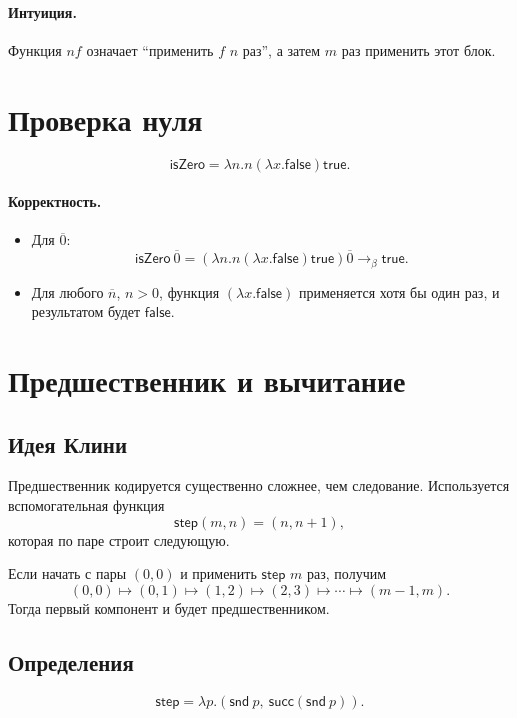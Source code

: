 \documentclass[12pt,a4paper]{article}
\theoremstyle{remark}
\begin{document}
\paragraph{Интуиция.}
Функция $nf$ означает ``применить $f$ $n$ раз'', а затем $m$ раз применить этот блок.

\section{Проверка нуля}

\[
\mathsf{isZero}
=
\lambda n.n(\lambda x.\mathsf{false})\mathsf{true}.
\]

\paragraph{Корректность.}
\begin{itemize}
    \item Для $\overline{0}$:
    \[
    \mathsf{isZero}\ \overline{0}
    =
    (\lambda n.n(\lambda x.\mathsf{false})\mathsf{true})\overline{0}
    \to_\beta
    \mathsf{true}.
    \]
    \item Для любого $\overline{n}$, $n>0$, функция $(\lambda x.\mathsf{false})$ применяется хотя бы один раз, и результатом будет $\mathsf{false}$.
\end{itemize}

\section{Предшественник и вычитание}

\subsection{Идея Клини}

Предшественник кодируется существенно сложнее, чем следование. Используется вспомогательная функция
\[
\mathsf{step}(m,n)=(n,n+1),
\]
которая по паре строит следующую.

Если начать с пары $(0,0)$ и применить $\mathsf{step}$ $m$ раз, получим
\[
(0,0)\mapsto (0,1)\mapsto (1,2)\mapsto (2,3)\mapsto \cdots \mapsto (m-1,m).
\]
Тогда первый компонент и будет предшественником.

\subsection{Определения}

\[
\mathsf{step}
=
\lambda p.(\mathsf{snd}\ p,\ \mathsf{succ}(\mathsf{snd}\ p)).
\]
\end{document}
